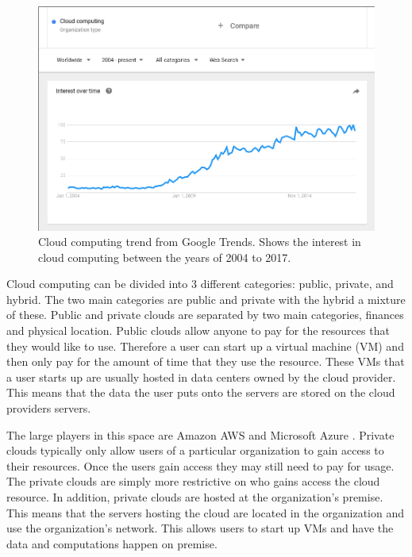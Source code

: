 \documentclass[12pt]{article}
\begin{document}
\begin{figure}[ht]
    \centering
    \includegraphics[scale=.4]{./pic/2017-06-14-130823_923x615_scrot.png}
    \caption{Cloud computing trend from Google Trends. Shows the interest in cloud computing between the years of 2004 to 2017. \cite{GoogleTrendsCloud}}
    \label{fig:CloudTrendGoogle}
\end{figure}

Cloud computing can be divided into 3 different categories: public, private, and hybrid.  The two main categories are public and private with the hybrid a mixture of these. Public and private clouds are separated by two main categories, finances and physical location. Public clouds allow anyone to pay for the resources that they would like to use. Therefore a user can start up a virtual machine (VM) and then only pay for the amount of time that they use the resource. These VMs that a user starts up are usually hosted in data centers owned by the cloud provider. This means that the data the user puts onto the servers are stored on the cloud providers servers.

The large players in this space are Amazon AWS \cite{amazonaws2017} and Microsoft Azure \cite{Azure2017}. Private clouds typically only allow users of a particular organization to gain access to their resources. Once the users gain access they may still need to pay for usage. The private clouds are simply more restrictive on who gains access the cloud resource. In addition, private clouds are hosted at the organization's premise.  This means that the servers hosting the cloud are located in the organization and use the organization's network. This allows users to start up VMs and have the data and computations happen on premise.
\end{document}
